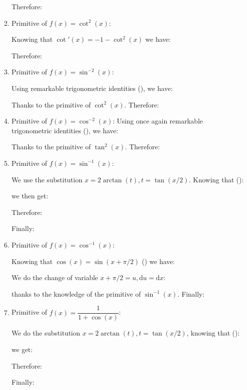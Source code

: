 \begin{enumerate}
		Therefore:
		
		\item Primitive of $f(x)=\cot ^{2}(x)$:
		
		Knowing that $\cot'(x)=-1-\cot^2(x)$ we have:
		
		Therefore:
		
		\item Primitive of $f(x)=\sin ^{-2}(x)$:
		
		Using remarkable trigonometric identities (), we have:
		
		Thanks to the primitive of $\cot^2(x)$. Therefore:
		
		\item Primitive of $f(x)=\cos ^{-2}(x)$:
		Using once again remarkable trigonometric identities (), we have:
		
		Thanks to the primitive of $\tan^2(x)$. Therefore:
		
		\item Primitive of $f(x)=\sin ^{-1}(x)$:
		
		We use the substitution $x=2\arctan(t),t=\tan(x/2)$. Knowing that ():
		
		we then get:
		
		Therefore:
		
		Finally:
		
		\item Primitive of $f(x)=\cos ^{-1}(x)$:
		
		Knowing that $\cos(x)=\sin(x+\pi/2)$ () we have:
		
		We do the change of variable $x+\pi/2=u, \mathrm{d}u=\mathrm{d}x$:
		
		thanks to the knowledge of the primitive of $\sin ^{-1}(x)$. Finally:
		
		\item Primitive of $f(x)=\dfrac{1}{1+\cos(x)}$:
		
		We do the substitution $x=2\arctan(t),t=\tan(x/2)$, knowing that ():
		
		we get:
		
		Therefore:
		
		Finally:
		

\end{enumerate}
